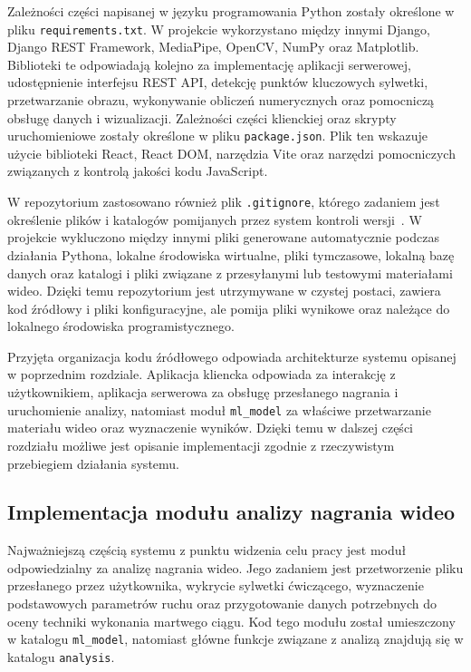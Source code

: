 Zależności części napisanej w języku programowania Python zostały określone w pliku \texttt{requirements.txt}. W projekcie wykorzystano między innymi Django, Django REST Framework, MediaPipe, OpenCV, NumPy oraz Matplotlib. Biblioteki te odpowiadają kolejno za implementację aplikacji serwerowej, udostępnienie interfejsu REST API, detekcję punktów kluczowych sylwetki, przetwarzanie obrazu, wykonywanie obliczeń numerycznych oraz pomocniczą obsługę danych i wizualizacji. Zależności części klienckiej oraz skrypty uruchomieniowe zostały określone w pliku \texttt{package.json}. Plik ten wskazuje użycie biblioteki React, React DOM, narzędzia Vite oraz narzędzi pomocniczych związanych z kontrolą jakości kodu JavaScript.

W repozytorium zastosowano również plik \texttt{.gitignore}, którego zadaniem jest określenie plików i katalogów pomijanych przez system kontroli wersji~\cite{gitignore_docs}. W projekcie wykluczono między innymi pliki generowane automatycznie podczas działania Pythona, lokalne środowiska wirtualne, pliki tymczasowe, lokalną bazę danych oraz katalogi i pliki związane z przesyłanymi lub testowymi materiałami wideo. Dzięki temu repozytorium jest utrzymywane w czystej postaci, zawiera kod źródłowy i pliki konfiguracyjne, ale pomija pliki wynikowe oraz należące do lokalnego środowiska programistycznego.

Przyjęta organizacja kodu źródłowego odpowiada architekturze systemu opisanej w poprzednim rozdziale. Aplikacja kliencka odpowiada za interakcję z użytkownikiem, aplikacja serwerowa za obsługę przesłanego nagrania i uruchomienie analizy, natomiast moduł \texttt{ml\_model} za właściwe przetwarzanie materiału wideo oraz wyznaczenie wyników. Dzięki temu w dalszej części rozdziału możliwe jest opisanie implementacji zgodnie z rzeczywistym przebiegiem działania systemu.

\subsection{Implementacja modułu analizy nagrania wideo}

Najważniejszą częścią systemu z punktu widzenia celu pracy jest moduł odpowiedzialny za analizę nagrania wideo. Jego zadaniem jest przetworzenie pliku przesłanego przez użytkownika, wykrycie sylwetki ćwiczącego, wyznaczenie podstawowych parametrów ruchu oraz przygotowanie danych potrzebnych do oceny techniki wykonania martwego ciągu. Kod tego modułu został umieszczony w katalogu \texttt{ml\_model}, natomiast główne funkcje związane z analizą znajdują się w katalogu \texttt{analysis}.

